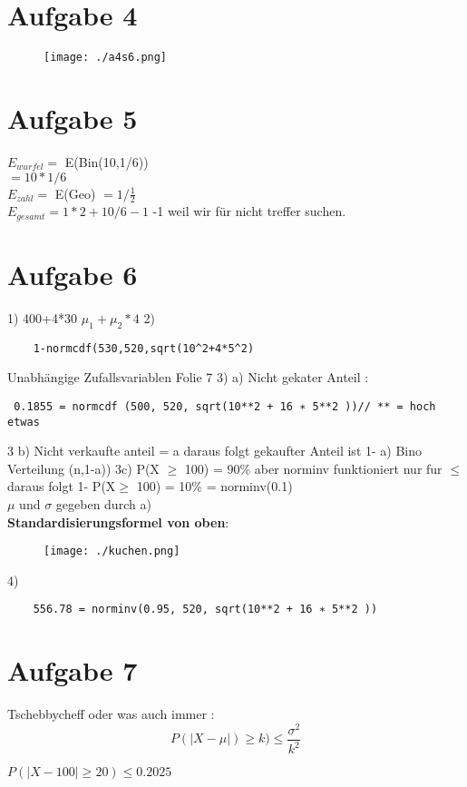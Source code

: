\documentclass[a4paper,10pt]{scrbook}
\begin{document}
\section*{Aufgabe 4}
\begin{figure}[h]
 \centering
 \texttt{[image: ./a4s6.png]}
\end{figure}

\section*{Aufgabe 5}
$ E_{wurfel} =$ E(Bin(10,1/6))  \\
$ = 10*1/6$ \\
$ E_{zahl} = $ E(Geo) $ = 1/\frac{1}{2}$ \\
$E_{gesamt} = 1*2 + 10/6 -1 $ -1 weil wir für nicht treffer suchen.


\section*{Aufgabe 6}

1) 400+4*30 $\mu_1 + \mu_2*4$
2) \begin{verbatim}
    1-normcdf(530,520,sqrt(10^2+4*5^2)
   \end{verbatim}
   Unabhängige Zufallsvariablen  Folie 7
3) a) Nicht gekater Anteil  : 
\begin{verbatim}
 0.1855 = normcdf (500, 520, sqrt(10**2 + 16 ∗ 5**2 ))// ** = hoch etwas
\end{verbatim}
3 b) Nicht verkaufte anteil = a daraus folgt gekaufter Anteil ist 1- a)
Bino Verteilung (n,1-a)) 
3c) P(X $\ge$ 100) = 90\% aber norminv funktioniert nur fur $\le$ daraus folgt  1- P(X$\ge$ 100) = 10\% = norminv(0.1)\\
$\mu $ und $\sigma$ gegeben durch a)\\
\textbf{Standardisierungsformel von oben}:
\begin{figure}[h]
 \centering
 \texttt{[image: ./kuchen.png]}
\end{figure}
4) \begin{verbatim}
    556.78 = norminv(0.95, 520, sqrt(10**2 + 16 ∗ 5**2 ))
   \end{verbatim}
\section*{Aufgabe 7}
\begin{framed}
 Tschebbycheff oder was auch immer :
 \begin{equation}
  P(|X - \mu|) \ge k) \le \frac{\sigma^2}{k^ 2}
 \end{equation}

\end{framed}
$ P(|X-100| \ge 20) \le 0.2025$
\end{document}
